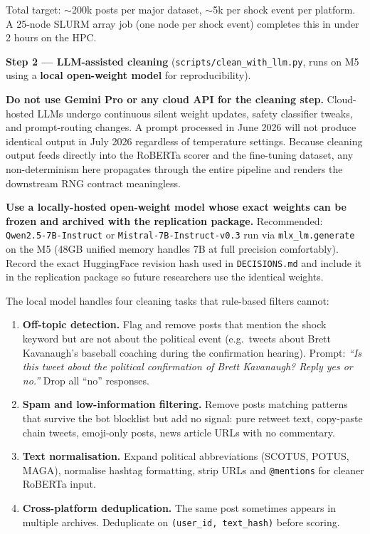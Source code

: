 \documentclass[11pt]{article}
\begin{document}
Total target: $\sim$200k posts per major dataset, $\sim$5k per shock event per
platform. A 25-node SLURM array job (one node per shock event) completes this
in under 2 hours on the HPC.

\medskip
\noindent\textbf{Step 2 --- LLM-assisted cleaning}
(\texttt{scripts/clean\_with\_llm.py}, runs on M5 using a \textbf{local open-weight
model} for reproducibility).

\begin{mdframed}[style=warnbox]
\textbf{Do not use Gemini Pro or any cloud API for the cleaning step.}
Cloud-hosted LLMs undergo continuous silent weight updates, safety classifier
tweaks, and prompt-routing changes. A prompt processed in June 2026 will not
produce identical output in July 2026 regardless of temperature settings.
Because cleaning output feeds directly into the RoBERTa scorer and the
fine-tuning dataset, any non-determinism here propagates through the entire
pipeline and renders the downstream RNG contract meaningless.

\textbf{Use a locally-hosted open-weight model whose exact weights can be
frozen and archived with the replication package.} Recommended:
\texttt{Qwen2.5-7B-Instruct} or \texttt{Mistral-7B-Instruct-v0.3} run via
\texttt{mlx\_lm.generate} on the M5 (48GB unified memory handles 7B at full
precision comfortably). Record the exact HuggingFace revision hash used in
\texttt{DECISIONS.md} and include it in the replication package so future
researchers use the identical weights.
\end{mdframed}

The local model handles four cleaning tasks that rule-based filters cannot:

\begin{enumerate}[leftmargin=2em, itemsep=2pt]
  \item \textbf{Off-topic detection.} Flag and remove posts that mention the
        shock keyword but are not about the political event (e.g.\ tweets about
        Brett Kavanaugh's baseball coaching during the confirmation hearing).
        Prompt: \textit{``Is this tweet about the political confirmation of Brett
        Kavanaugh? Reply yes or no.''} Drop all ``no'' responses.
  \item \textbf{Spam and low-information filtering.} Remove posts matching
        patterns that survive the bot blocklist but add no signal: pure retweet
        text, copy-paste chain tweets, emoji-only posts, news article URLs
        with no commentary.
  \item \textbf{Text normalisation.} Expand political abbreviations (SCOTUS,
        POTUS, MAGA), normalise hashtag formatting, strip URLs and
        \texttt{@mentions} for cleaner RoBERTa input.
  \item \textbf{Cross-platform deduplication.} The same post sometimes appears
        in multiple archives. Deduplicate on \texttt{(user\_id, text\_hash)}
        before scoring.
\end{enumerate}
\end{document}
